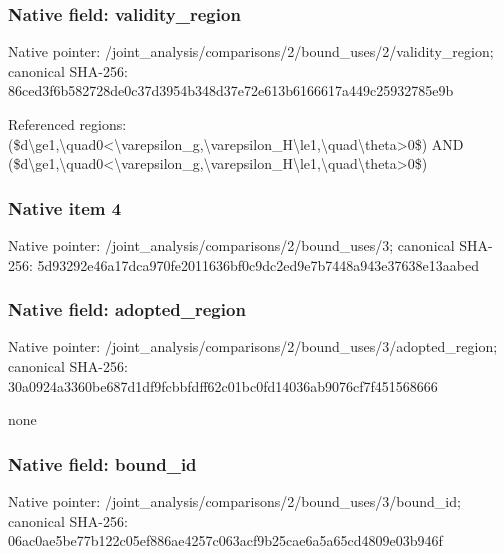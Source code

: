 \documentclass[10pt,a4paper]{article}
\begin{document}
\subsubsection{Native field: validity\_\allowbreak{}region}
Native pointer: /joint\_\allowbreak{}analysis/comparisons/2/bound\_\allowbreak{}uses/2/validity\_\allowbreak{}region; canonical SHA-256: 86ced3f6b582728de0c37d3954b348d37e72e613b6166617a449c25932785e9b

\begingroup\raggedright\sloppy Referenced regions:\allowbreak{} (\$d\textbackslash{}ge1,\allowbreak{}\textbackslash{}quad0<\textbackslash{}varepsilon\_\allowbreak{}g,\allowbreak{}\textbackslash{}varepsilon\_\allowbreak{}H\textbackslash{}le1,\allowbreak{}\textbackslash{}quad\textbackslash{}theta>0\$) AND (\$d\textbackslash{}ge1,\allowbreak{}\textbackslash{}quad0<\textbackslash{}varepsilon\_\allowbreak{}g,\allowbreak{}\textbackslash{}varepsilon\_\allowbreak{}H\textbackslash{}le1,\allowbreak{}\textbackslash{}quad\textbackslash{}theta>0\$)\par\endgroup

\subsubsection{Native item 4}
Native pointer: /joint\_\allowbreak{}analysis/comparisons/2/bound\_\allowbreak{}uses/3; canonical SHA-256: 5d93292e46a17dca970fe2011636bf0c9dc2ed9e7b7448a943e37638e13aabed

\subsubsection{Native field: adopted\_\allowbreak{}region}
Native pointer: /joint\_\allowbreak{}analysis/comparisons/2/bound\_\allowbreak{}uses/3/adopted\_\allowbreak{}region; canonical SHA-256: 30a0924a3360be687d1df9fcbbfdff62c01bc0fd14036ab9076cf7f451568666

\begingroup\raggedright\sloppy none\par\endgroup

\subsubsection{Native field: bound\_\allowbreak{}id}
Native pointer: /joint\_\allowbreak{}analysis/comparisons/2/bound\_\allowbreak{}uses/3/bound\_\allowbreak{}id; canonical SHA-256: 06ac0ae5be77b122c05ef886ae4257c063acf9b25cae6a5a65cd4809e03b946f
\end{document}
